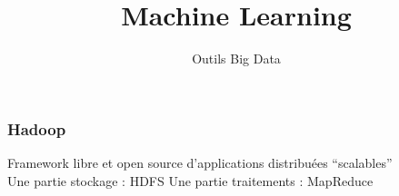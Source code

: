 \documentclass{formation}
\title{Machine Learning}
\subtitle{Outils Big Data}
\begin{document}
\maketitle

\begin{frame}
  \frametitle{Hadoop}
  Framework libre et open source d'applications distribuées ``scalables'' \\
  Une partie stockage : HDFS
  Une partie traitements : MapReduce
\end{frame}
\end{document}
